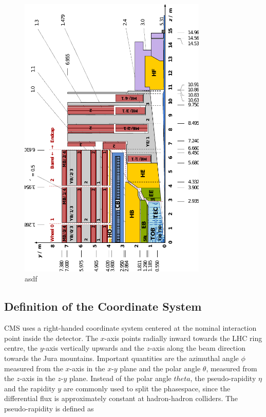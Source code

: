 \begin{figure}[htp]
    \centering
    \includegraphics[width=0.8\textwidth]{figures/cms_detector/cms_longitudinal_section.pdf}
    \caption[Longitudinal section of the CMS detector]{asdf}
    \label{fig:cms:longitudinal_section}
\end{figure}


\subsection{Definition of the Coordinate System}

CMS uses a right-handed coordinate system centered at the nominal interaction point inside the
detector. The $x$-axis points radially inward towards the LHC ring centre, the
$y$-axis vertically upwards and the $z$-axis along the beam direction towards
the Jura mountains. Important quantities are the azimuthal angle $\phi$
measured from the $x$-axis in the $x$-$y$ plane and the polar angle $\theta$,
measured from the $z$-axis in the $z$-$y$ plane. Instead of the polar angle
$theta$, the pseudo-rapidity $\eta$ and the rapidity $y$ are commonly used to
split the phasespace, since the differential flux is approximately constant at
hadron-hadron colliders. The pseudo-rapidity is defined as

